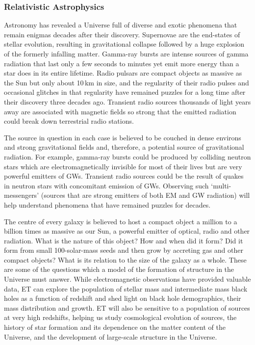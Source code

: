\FloatBarrier
\subsubsection{Relativistic Astrophysics}
Astronomy has revealed a Universe full of diverse and exotic phenomena that remain enigmas decades after their discovery.
Supernovae are the end-states of stellar evolution, resulting in gravitational collapse followed by a huge explosion of the formerly infalling matter.
Gamma-ray bursts are intense sources of gamma radiation that last only a few seconds to minutes yet emit more energy than a star does in its entire lifetime.
Radio pulsars are compact objects as massive as the Sun but only about 10\,km in size, and the regularity of their radio pulses and occasional glitches in that regularity have remained  puzzles for a long time after their discovery three decades ago.
Transient radio sources thousands of light years away are associated with magnetic fields so strong that the emitted radiation could break down terrestrial radio stations.

The source in question in each case is believed to be couched in dense environs and strong gravitational fields and, therefore, a potential source of gravitational radiation. For example, gamma-ray bursts could be produced by colliding neutron stars which are electromagnetically invisible for most of their lives but are very powerful emitters of GWs. Transient radio sources could be the result of quakes in neutron stars with concomitant emission of GWs.
Observing such `multi-messengers' (sources that are strong emitters of both EM and GW radiation) will help understand phenomena that have remained puzzles for decades.

The centre of every galaxy is believed to host a compact object a million to a billion times as massive as our Sun, a powerful emitter of optical, radio and other radiation.
What is the nature of this object? How and when did it form?
Did it form from small 100-solar-mass seeds and then grow by accreting gas and other compact objects? What is its relation to the size of the galaxy as a whole.
These are some of the questions which a model of the formation of structure in the Universe must answer.  
While electromagnetic observations  have provided valuable data, ET can explore the population of stellar mass and intermediate mass black holes as a function  of redshift and shed light on black hole demographics, their 
mass distribution and growth.
ET will also be sensitive to a population of sources at very high redshifts, helping us study cosmological evolution of sources, the history of star formation and its dependence on the matter content of the Universe, and the development of large-scale structure in the Universe. 
\FloatBarrier
